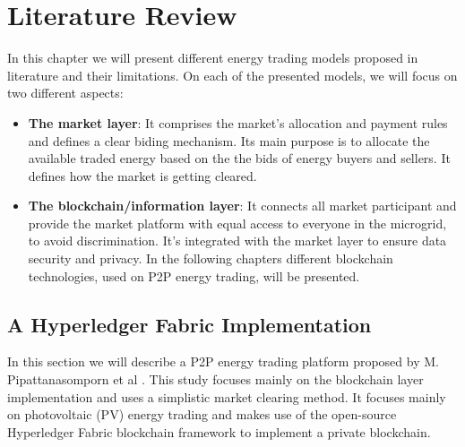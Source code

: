 \chapter{Literature Review} \label{literature}
In this chapter we will present different energy trading models proposed in literature
and their limitations. On each of the presented models, we will focus on two different
aspects:
\begin{itemize}
    \item \textbf{The market layer}: It comprises the market's allocation and payment rules and defines
          a clear biding mechanism. Its main purpose is to allocate the available traded energy based on the
          the bids of energy buyers and sellers. It defines how the market is getting cleared.
    \item \textbf{The blockchain/information layer}: It connects all market participant and provide the market platform with equal
          access to everyone in the microgrid, to avoid discrimination. It's integrated with the market layer to ensure
          data security and privacy. In the following chapters different blockchain technologies, used on P2P energy trading, will
          be presented. \cite{DeTrade,BrooklynMicrogrid}
\end{itemize}


\section{A Hyperledger Fabric Implementation}
\label{sec:hfi}
In this section we will describe a P2P energy trading platform proposed by M. Pipattanasomporn et al \cite{Pipattanasomporn2013}.
This study focuses mainly on the blockchain layer implementation and uses a simplistic market clearing method.
It focuses mainly on photovoltaic (PV) energy trading and makes use of the open-source Hyperledger Fabric blockchain framework
to implement a private blockchain.
